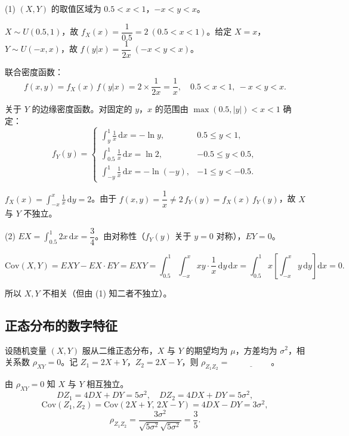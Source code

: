 \documentclass[lang=cn,11pt]{elegantbook}
\begin{document}
\begin{solution}
(1) \((X,Y)\) 的取值区域为 \(0.5 < x < 1\)，\(-x < y < x\)。

\(X \sim U(0.5, 1)\)，故 \(f_X(x) = \dfrac{1}{0.5} = 2\ (0.5 < x < 1)\)。给定 \(X = x\)，\(Y \sim U(-x, x)\)，故 \(f(y|x) = \dfrac{1}{2x}\ (-x < y < x)\)。

联合密度函数：
\[
f(x,y) = f_X(x)\,f(y|x) = 2 \times \frac{1}{2x} = \frac{1}{x},\quad 0.5 < x < 1,\ -x < y < x.
\]

关于 \(Y\) 的边缘密度函数。对固定的 \(y\)，\(x\) 的范围由 \(\max(0.5, |y|) < x < 1\) 确定：
\[
f_Y(y) = \begin{cases}
\displaystyle\int_y^1 \frac{1}{x}\,\mathrm{d}x = -\ln y, & 0.5 \leqslant y < 1, \\[8pt]
\displaystyle\int_{0.5}^1 \frac{1}{x}\,\mathrm{d}x = \ln 2, & -0.5 \leqslant y < 0.5, \\[8pt]
\displaystyle\int_{-y}^1 \frac{1}{x}\,\mathrm{d}x = -\ln(-y), & -1 \leqslant y < -0.5.
\end{cases}
\]

\(f_X(x) = \displaystyle\int_{-x}^{x} \frac{1}{x}\,\mathrm{d}y = 2\)。由于 \(f(x,y) = \dfrac{1}{x} \neq 2\,f_Y(y) = f_X(x)\,f_Y(y)\)，故 \(X\) 与 \(Y\) 不独立。

(2) \(EX = \displaystyle\int_{0.5}^{1} 2x\,\mathrm{d}x = \dfrac{3}{4}\)。由对称性（\(f_Y(y)\) 关于 \(y = 0\) 对称），\(EY = 0\)。

\[
\mathrm{Cov}(X,Y) = EXY - EX \cdot EY = EXY = \int_{0.5}^{1}\int_{-x}^{x} xy \cdot \frac{1}{x}\,\mathrm{d}y\,\mathrm{d}x = \int_{0.5}^{1} x\!\left[\int_{-x}^{x} y\,\mathrm{d}y\right]\mathrm{d}x = 0.
\]

所以 \(X, Y\) 不相关（但由 (1) 知二者不独立）。
\end{solution}

\subsection{正态分布的数字特征}

\begin{exercise}\label{exer:4-s2-z1z2}
设随机变量 \((X,Y)\) 服从二维正态分布，\(X\) 与 \(Y\) 的期望均为 \(\mu\)，方差均为 \(\sigma^2\)，相关系数 \(\rho_{XY} = 0\)。记 \(Z_1 = 2X+Y\)，\(Z_2 = 2X-Y\)，则 \(\rho_{Z_1Z_2} =\,\underline{\hspace{2cm}}\)。
\end{exercise}
\begin{solution}
由 \(\rho_{XY} = 0\) 知 \(X\) 与 \(Y\) 相互独立。
\[
DZ_1 = 4DX + DY = 5\sigma^2,\quad DZ_2 = 4DX + DY = 5\sigma^2,
\]
\[
\mathrm{Cov}(Z_1,Z_2) = \mathrm{Cov}(2X+Y,\, 2X-Y) = 4DX - DY = 3\sigma^2,
\]
\[
\rho_{Z_1Z_2} = \frac{3\sigma^2}{\sqrt{5\sigma^2}\sqrt{5\sigma^2}} = \frac{3}{5}.
\]
\end{solution}
\end{document}
